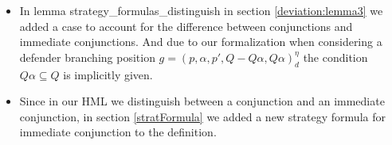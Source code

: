 \begin{itemize}
  \item In lemma strategy\_formulas\_distinguish in section \ref{deviation:lemma3} we added a case to account for the difference between 
  conjunctions and immediate conjunctions. And due to our formalization when considering a
  defender branching position $g=(p,\alpha ,p', Q - Q\alpha, Q\alpha)_d^\eta$ the condition 
  $Q \alpha \subseteq Q$ is implicitly given.
  
  \item Since in our HML we distinguish between a conjunction and an immediate conjunction, in section \ref{stratFormula} 
  we added a new strategy formula for immediate conjunction to the definition.
\end{itemize}
